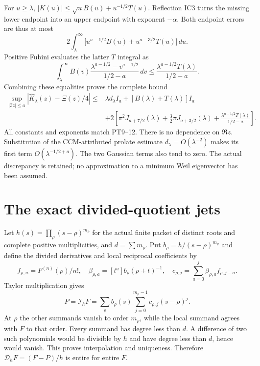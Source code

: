 For $u\ge\lambda$, $|K(u)|\le\sqrt u B(u)+u^{-1/2}T(u)$.
Reflection IC3 turns the missing lower endpoint into an upper
endpoint with exponent $-\alpha$. Both endpoint errors are thus
at most
\[
 2\int_\lambda^\infty
     \big[u^{a-1/2}B(u)+u^{a-3/2}T(u)\big]\,du.
\]
Positive Fubini evaluates the latter $T$ integral as
\[
 \int_\lambda^\infty B(v)
       \frac{\lambda^{a-1/2}-v^{a-1/2}}{1/2-a}\,dv
 \le\frac{\lambda^{a-1/2}T(\lambda)}{1/2-a}.
\]
Combining these equalities proves the complete bound
\begin{equation}\tag{IC9}
 \begin{split}
 \sup_{|\Im z|\le a}|\widehat K_\lambda(z)-\Xi(z)/4|
 \le{}&\lambda d_\lambda I_a+[B(\lambda)+T(\lambda)]I_a\\
 &+2\left[\pi^2J_{a+7/2}(\lambda)
 +\tfrac32\pi J_{a+3/2}(\lambda)
 +\frac{\lambda^{a-1/2}T(\lambda)}{1/2-a}\right].
 \end{split}
\end{equation}
All constants and exponents match PT9--12. There is no dependence
on $\Re z$. Substitution of the CCM-attributed prolate estimate
$d_\lambda=O(\lambda^{-2})$ makes its first term
$O(\lambda^{-1/2+a})$. The two Gaussian terms also tend to zero.
The actual discrepancy is retained; no approximation to a minimum
Weil eigenvector has been assumed.

\section{The exact divided-quotient jets}
Let $h(s)=\prod_\rho(s-\rho)^{m_\rho}$ for the actual finite
packet of distinct roots and complete positive multiplicities,
and $d=\sum m_\rho$. Put $b_\rho=h/(s-\rho)^{m_\rho}$ and define
the divided derivatives and local reciprocal coefficients by
\[
 f_{\rho,n}=F^{(n)}(\rho)/n!,\quad
 \beta_{\rho,a}=[t^a]b_\rho(\rho+t)^{-1},\quad
 c_{\rho,j}=\sum_{a=0}^j\beta_{\rho,a}f_{\rho,j-a}.
\]
Taylor multiplication gives
\begin{equation}\tag{IC10}
 P=\mathcal I_hF=\sum_\rho b_\rho(s)
                   \sum_{j=0}^{m_\rho-1}c_{\rho,j}(s-\rho)^j.
\end{equation}
At $\rho$ the other summands vanish to order $m_\rho$, while
the local summand agrees with $F$ to that order. Every summand
has degree less than $d$. A difference of two such polynomials
would be divisible by $h$ and have degree less than $d$, hence
would vanish. This proves interpolation and uniqueness.
Therefore $\mathcal D_hF=(F-P)/h$ is entire for entire $F$.

